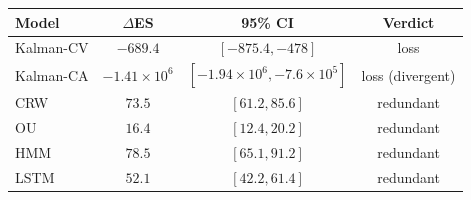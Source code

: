 \begin{tabular}{lccc}
\toprule
Model & $\Delta$ES & 95\% CI & Verdict \\
\midrule
Kalman-CV & $-689.4$ & $[-875.4,-478]$ & loss \\
Kalman-CA & $-1.41\times10^{6}$ & $[-1.94\times10^{6},-7.6\times10^{5}]$ & loss (divergent) \\
CRW & $73.5$ & $[61.2,85.6]$ & redundant \\
OU & $16.4$ & $[12.4,20.2]$ & redundant \\
HMM & $78.5$ & $[65.1,91.2]$ & redundant \\
LSTM & $52.1$ & $[42.2,61.4]$ & redundant \\
\bottomrule
\end{tabular}
